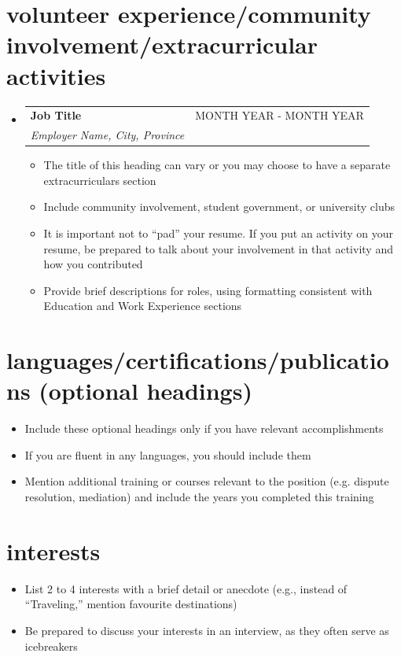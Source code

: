 \documentclass[letterpaper,11pt]{article}
\makeatletter
\newcommand{\resumeItem}[1]{
  \item\small{
    {#1 \vspace{-4pt}}
  }
}
\newcommand{\resumeSubheading}[4]{
  \vspace{-2pt}\item
    \begin{tabular*}{0.97\textwidth}[t]{l@{\extracolsep{\fill}}r}
      \vspace{-2pt}
      \textbf{#1} & #2 \\
      \vspace{-1pt}
      \textit{\small#3} & \textit{\small #4} \\
    \end{tabular*}\vspace{-7pt}
}
\newcommand{\resumeSubHeadingListStart}{\begin{itemize}[leftmargin=0.15in, label={}]}
\newcommand{\resumeSubHeadingListEnd}{\end{itemize}}
\newcommand{\resumeItemListStart}{\begin{itemize}}
\newcommand{\resumeItemListEnd}{\end{itemize}\vspace{-5pt}}
\makeatother
\begin{document}
\section{volunteer experience/community involvement/extracurricular activities}
  \resumeSubHeadingListStart
    \resumeSubheading
      {Job Title}{MONTH YEAR - MONTH YEAR}
      {Employer Name, City, Province}{}
      \resumeItemListStart
        \resumeItem{The title of this heading can vary or you may choose to have a separate extracurriculars section}
        \resumeItem{Include community involvement, student government, or university clubs}
        \resumeItem{It is important not to “pad” your resume. If you put an activity on your resume, be prepared to talk about your involvement in that activity and how you contributed}
        \resumeItem{Provide brief descriptions for roles, using formatting consistent with Education and Work Experience sections}
      \resumeItemListEnd
  \resumeSubHeadingListEnd

\section{languages/certifications/publications (optional headings)}
  \resumeItemListStart
    \resumeItem{Include these optional headings only if you have relevant accomplishments}
    \resumeItem{If you are fluent in any languages, you should include them}
    \resumeItem{Mention additional training or courses relevant to the position (e.g. dispute resolution, mediation) and include the years you completed this training}
  \resumeItemListEnd

\section{interests}
  \resumeItemListStart
    \resumeItem{List 2 to 4 interests with a brief detail or anecdote (e.g., instead of “Traveling,” mention favourite destinations)}
    \resumeItem{Be prepared to discuss your interests in an interview, as they often serve as icebreakers}
  \resumeItemListEnd

%


\end{document}
